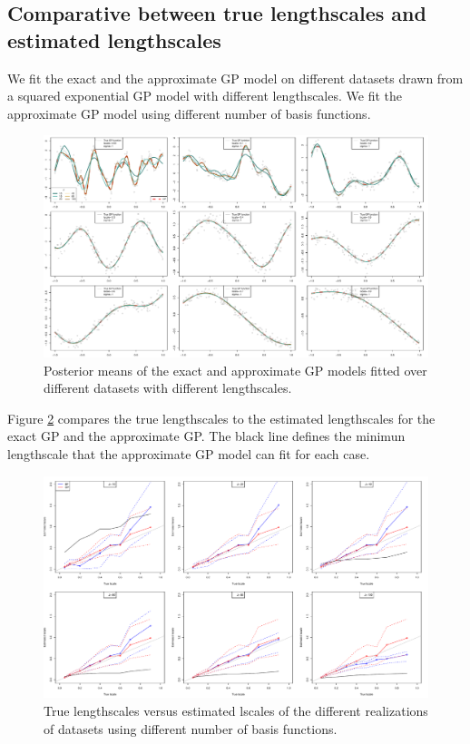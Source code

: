 \documentclass[]{interact}
\theoremstyle{plain}%
\theoremstyle{definition}
\theoremstyle{remark}
\begin{document}
\subsection{Comparative between true lengthscales and estimated lengthscales}

We fit the exact and the approximate GP model on different datasets drawn from a squared exponential GP model with different lengthscales. We fit the approximate GP model using different number of basis functions.

\begin{figure}[H]
\centering
\includegraphics[scale=0.4]{fig7_varing_lscale.pdf}
\caption{Posterior means of the exact and approximate GP models fitted over different datasets with different lengthscales.}
  \label{fig7_varing_lscale}
\end{figure}

Figure \ref{fig8_Tlscale_vs_Elscale} compares the true lengthscales to the estimated lengthscales for the exact GP and the approximate GP. The black line defines the minimun lengthscale that the approximate GP model can fit for each case.

\begin{figure}[H]
\centering
\includegraphics[scale=0.4]{fig8_Tlscale_vs_Elscale.pdf}
\caption{True lengthscales versus estimated lscales of the different realizations of datasets using different number of basis functions. }
  \label{fig8_Tlscale_vs_Elscale}
\end{figure}
\end{document}
